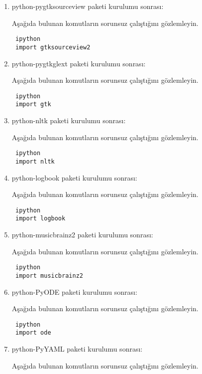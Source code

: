 \documentclass[a4paper,10pt]{article}
\begin{document}
\begin{enumerate}
\item python-pygtksourceview paketi kurulumu sonrası:

Aşağıda bulunan komutların sorunsuz çalıştığını gözlemleyin.

\begin{verbatim}
 ipython
 import gtksourceview2
\end{verbatim}

\item python-pygtkglext paketi kurulumu sonrası:

Aşağıda bulunan komutların sorunsuz çalıştığını gözlemleyin.

\begin{verbatim}
 ipython
 import gtk
\end{verbatim}

\item python-nltk paketi kurulumu sonrası:

Aşağıda bulunan komutların sorunsuz çalıştığını gözlemleyin.

\begin{verbatim}
 ipython
 import nltk
\end{verbatim}

\item python-logbook paketi kurulumu sonrası:

Aşağıda bulunan komutların sorunsuz çalıştığını gözlemleyin.

\begin{verbatim}
 ipython
 import logbook
\end{verbatim}

\item python-musicbrainz2 paketi kurulumu sonrası:

Aşağıda bulunan komutların sorunsuz çalıştığını gözlemleyin.

\begin{verbatim}
 ipython
 import musicbrainz2
\end{verbatim}

\item python-PyODE paketi kurulumu sonrası:

Aşağıda bulunan komutların sorunsuz çalıştığını gözlemleyin.

\begin{verbatim}
 ipython
 import ode
\end{verbatim}

\item python-PyYAML paketi kurulumu sonrası:

Aşağıda bulunan komutların sorunsuz çalıştığını gözlemleyin.


\end{enumerate}
\end{document}
